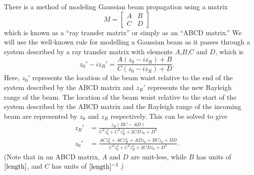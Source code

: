 
There is a method of modeling Gaussian beam propagation using a matrix
\begin{equation}
M=\begin{bmatrix}A&B \\C&D\end{bmatrix}
\end{equation}
which is known as a ``ray transfer matrix'' or simply as an ``ABCD matrix.'' We will use the well-known rule \cite{BYUOpticsBook}\cite{lasersMilonniEberly} for modelling a Gaussian beam as it passes through a system described by a ray transfer matrix with elements $A$,$B$,$C$ and $D$, which is 
\begin{equation} \label{ABCDlawforGaussianBeams}
z_0'-iz_R'=\frac{A(z_0-iz_R)+B}{C(z_0-iz_R)+D}.
\end{equation}
Here, $z_0'$ represents the location of the beam waist relative to the end of the system described by the ABCD matrix and $z_R'$ represents the new Rayleigh range of the beam. The location of the beam waist relative to the start of the system described by the ABCD matrix and the Rayleigh range of the incoming beam are represented by $z_0$ and $z_R$ respectively.
This can be solved to give 
\begin{align}
z_R' &= \frac{ z_R (BC-AD)}{C^2z_0^2+C^2z_R^2+2 C D z_0 + D^2} \\
z_0' &=\frac{AC z_0^2+ACz_R^2+ADz_0+BCz_0+BD}{C^2z_0^2+C^2z_R^2+2 C D z_0 + D^2}.
\end{align}
(Note that in an ABCD matrix, $A$ and $D$ are unit-less, while $B$ has units of $[\textnormal{length}]$, and $C$ has units of $[\textnormal{length}]^{-1}$.)


